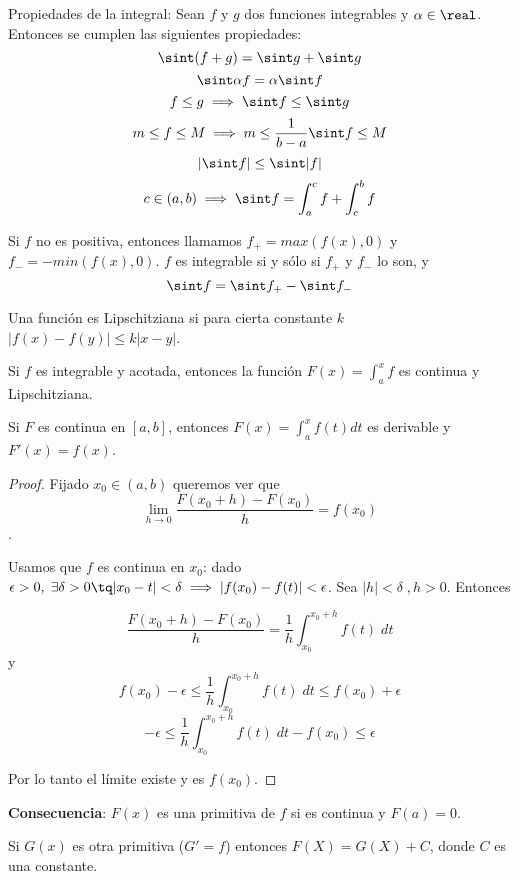 \documentclass[nochap]{apuntes}
\begin{document}
Propiedades de la integral: Sean $f$ y $g$ dos funciones integrables y $\alpha \in \real$. Entonces se cumplen las siguientes propiedades: \[\sint (f+g) = \sint g + \sint g \]
 \[ \sint \alpha f = \alpha \sint f \]
 \[ f\leq g \implies \sint f \leq \sint g \]
 \[m\leq f \leq M \implies m \leq \frac{1}{b-a}\sint f \leq M \]
 \[ \left|\sint f\right | \leq \sint |f| \]
 \[ c \in (a,b) \implies \sint  f= \int_a^c f + \int_c^b f \]

\begin{prop} Si $f$ no es positiva, entonces llamamos $f_+ = max(f(x),0)$ y $f_- = - min(f(x),0)$. $f$ es integrable si y sólo si $f_+$ y $f_-$ lo son, y \[\sint  f =\sint f_+ -\sint  f_-\]\end{prop}

\begin{defn}
Una función es Lipschitziana si para cierta constante $k$ $|f(x) - f(y)| \leq k |x-y|$.\end{defn}

\begin{theorem}
Si $f$ es integrable y acotada, entonces la función $F(x)=\int_a^x f$ es continua y Lipschitziana.
\end{theorem}

\begin{theorem}
Si $F$ es continua en $[a,b]$, entonces $F(x)=\int_a^x f(t) dt$ es derivable y $F'(x) = f(x)$.
\end{theorem}

\begin{proof}
Fijado $x_0\in (a,b)$ queremos ver que \[\lim_{h\to 0}\frac{F(x_0+h)-F(x_0)}{h}=f(x_0)\].

Usamos que $f$ es continua en $x_0$: dado $\epsilon>0, \; \exists \delta >0 \tq |x_0-t| < \delta \implies |f(x_0)-f(t)| < \epsilon$. Sea $|h| < \delta\; , h>0$. Entonces

\[ \frac{F(x_0+h)-F(x_0)}{h} = \frac{1}{h} \int_{x_0}^{x_0+h}f(t)\;dt \] y \[ f(x_0)-\epsilon \leq \frac{1}{h} \int_{x_0}^{x_0+h}f(t)\;dt \leq f(x_0) + \epsilon\] \[-\epsilon \leq \frac{1}{h} \int_{x_0}^{x_0+h}f(t)\;dt - f(x_0) \leq  \epsilon\]

Por lo tanto el límite existe y es $f(x_0)$.
\end{proof}

{\bf Consecuencia}: $F(x)$ es una primitiva de $f$ si es continua y $F(a)=0$.

Si $G(x)$ es otra primitiva ($G' = f$) entonces $F(X) = G(X) + C$, donde $C$ es una constante.
\end{document}
